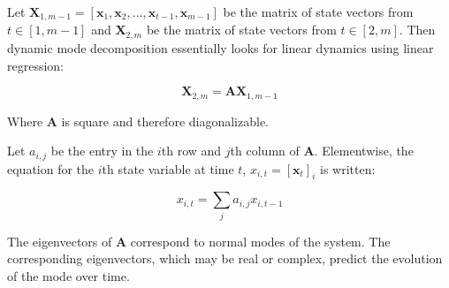 Let $\mathbf{X}_{1,m-1} = \left[\mathbf{x}_1,\mathbf{x}_2,...,\mathbf{x}_{t-1},\mathbf{x}_{m-1}\right]$ be the matrix of state vectors from $t\in[1,m-1]$ and $\mathbf{X}_{2,m}$ be the matrix of state vectors from $t\in[2,m]$. Then dynamic mode decomposition essentially looks for linear dynamics using linear regression:

\begin{equation}
\mathbf{X}_{2,m} = \mathbf{A}\mathbf{X}_{1,m-1}
\end{equation}

Where $\mathbf{A}$ is square and therefore diagonalizable.

Let $a_{i,j}$ be the entry in the $i$th row and $j$th column of $\mathbf{A}$. Elementwise, the equation for the $i$th state variable at time $t$, $x_{i,t} = [\mathbf{x}_t]_i$ is written:

\begin{equation}
x_{i,t} = \sum_j a_{i,j} x_{i,t-1}
\end{equation}

The eigenvectors of $\mathbf{A}$  correspond to normal modes of the system. The corresponding eigenvectors, which may be real or complex, predict the evolution of the mode over time.
